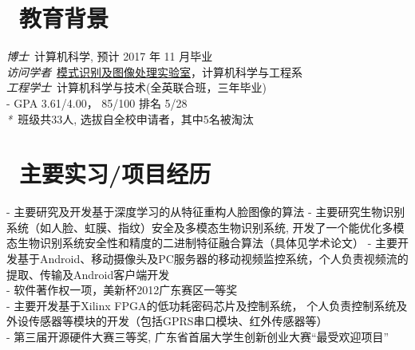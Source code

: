 \documentclass{resume}
\begin{document}


 
\section{\faGraduationCap\  教育背景}
\textit{博士}\ 计算机科学, 预计 2017 年 11 月毕业\\
\textit{访问学者}\ \href{http://biometrics.cse.msu.edu/}{模式识别及图像处理实验室}，计算机科学与工程系\\
\textit{工程学士}\ 计算机科学与技术(全英联合班，三年毕业)\\
- GPA 3.61/4.00， 85/100 排名 5/28\\
\textit{*}\ 班级共33人, 选拔自全校申请者，其中5名被淘汰\\

\section{\faUsers\ 主要实习/项目经历}
- 主要研究及开发基于深度学习的从特征重构人脸图像的算法
- 主要研究生物识别系统（如人脸、虹膜、指纹）安全及多模态生物识别系统, 开发了一个能优化多模态生物识别系统安全性和精度的二进制特征融合算法（具体见学术论文）
- 主要开发基于Android、移动摄像头及PC服务器的移动视频监控系统，个人负责视频流的提取、传输及Android客户端开发\\
- 软件著作权一项，美新杯2012广东赛区一等奖\\
- 主要开发基于Xilinx FPGA的低功耗密码芯片及控制系统， 个人负责控制系统及外设传感器等模块的开发（包括GPRS串口模块、红外传感器等）\\
- 第三届开源硬件大赛三等奖, 广东省首届大学生创新创业大赛“最受欢迎项目”
\end{document}

